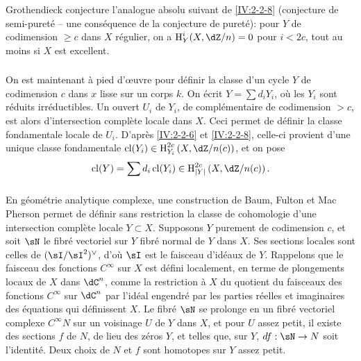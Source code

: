 \subsubsection{}\label{IV:2-2-9}

Grothendieck conjecture l'analogue absolu suivant de \ref{IV:2-2-8} (conjecture 
de semi-pureté -- une conséquence de la conjecture de pureté): pour $Y$ 
de codimension $\geqslant c$ dans $X$ régulier, on a $\h_Y^i(X,\dZ/n)=0$ pour 
$i<2 c$, tout au moins si $X$ est excellent. 





\subsubsection{}\label{IV:2-2-10}

On est maintenant à pied d'œuvre pour définir la classe d'un cycle $Y$ de 
codimension $c$ dans $x$ lisse sur un corps $k$. On écrit $Y=\sum d_i Y_i$, 
où les $Y_i$ sont réduits irréductibles. Un ouvert $U_i$ de $Y_i$, de 
complémentaire de codimension $>c$, est alors d'intersection complète 
locale dans $X$. Ceci permet de définir la classe fondamentale locale de 
$U_i$. D'après \ref{IV:2-2-6} et \ref{IV:2-2-8}, celle-ci provient d'une 
unique classe fondamentale $\cl(Y_i)\in \h_{Y_i}^{2 c}\left(X,\dZ/n(c)\right)$, 
et on pose 
\[
  \cl(Y) = \sum d_i \cl(Y_i) \in \h_{|Y|}^{2 c}\left(X,\dZ/n(c)\right) \text{.}
\]





\subsubsection{}\label{IV:2-2-11}

En géométrie analytique complexe, une construction de Baum, Fulton et 
Mac Pherson \cite{bfm75} permet de définir sans restriction la classe de 
cohomologie d'une intersection complète locale $Y\subset X$. Supposons $Y$ 
purement de codimension $c$, et soit $\sN$ le fibré vectoriel sur $Y$ fibré 
normal de $Y$ dans $X$. Ses sections locales sont celles de $(\sI/\sI^2)^\vee$, 
d'où $\sI$ est le faisceau d'idéaux de $Y$. Rappelons que le faisceau des 
fonctions $C^\infty$ sur $X$ est défini localement, en terme de plongements 
locaux de $X$ dans $\dC^n$, comme la restriction à $X$ du quotient du 
faisceaux des fonctions $C^\infty$ sur $\dC^n$ par l'idéal engendré par les 
parties réelles et imaginaires des équations qui définissent $X$. Le 
fibré $\sN$ se prolonge en un fibré vectoriel complexe $C^\infty N$ sur un 
voisinage $U$ de $Y$ dans $X$, et pour $U$ assez petit, il existe des sections 
$f$ de $N$, de lieu des zéros $Y$, et telles que, sur $Y$, $d f:\sN\to N$ 
soit l'identité. Deux choix de $N$ et $f$ sont homotopes sur $Y$ assez petit. 

